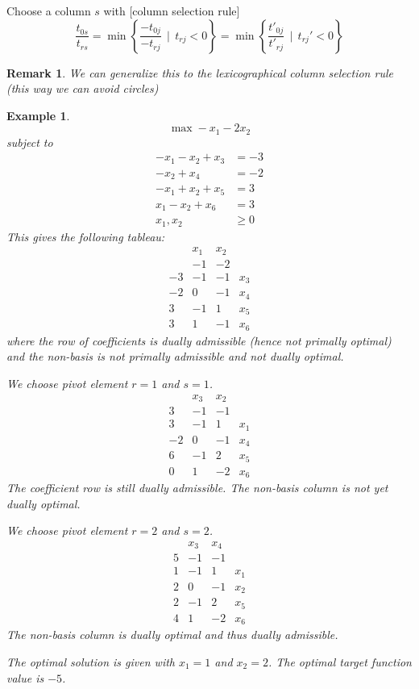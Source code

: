 \documentclass[a4paper]{article}
\numberwithin{lecref}{section}
\newcounter{exercises}
\newtheorem{example}[exercises]{Example}
\newtheorem*{Remark}{Remark}
\newcommand{\SetDef}[2]{\left\{#1\,\mid\,#2\right\}}
\begin{document}
Choose a column $s$ with [column selection rule]
\[ \frac{t_{0s}}{t_{rs}} = \min\SetDef{\frac{-t_{0j}}{-t_{rj}}}{t_{rj} < 0} = \min\SetDef{\frac{t'_{0j}}{t'_{rj}}}{t_{rj}' < 0} \]

\begin{Remark}
	We can generalize this to the lexicographical column selection rule (this way we can avoid circles)
\end{Remark}

\begin{example}
	\[ \max -x_1 - 2x_2 \]
	subject to
	\begin{align*}
		-x_1 - x_2 + x_3 &= -3 \\
		-x_2 + x_4 &= -2 \\
		-x_1 + x_2 + x_5 &= 3 \\
		x_1 - x_2 + x_6 &= 3 \\
		x_1, x_2 &\geq 0
	\end{align*}
	This gives the following tableau:
	\[\begin{array}{c|ccc}
		   & x_1 & x_2 & \\
		   & -1 & -2 & \\
		\hline
		-3 & -1 & -1 & x_3 \\
		-2 & 0 & -1 & x_4 \\
		3  & -1 & 1 & x_5 \\
		3  & 1 & -1 & x_6
	\end{array}\]
	where the row of coefficients is dually admissible (hence not primally optimal) and the non-basis is not primally admissible and not dually optimal.

	We choose pivot element $r = 1$ and $s = 1$.
	\[\begin{array}{c|ccc}
		   & x_3 & x_2 & \\
		3  & -1 & -1 & \\
		\hline
		3 & -1 & 1 & x_1 \\
		-2 & 0 & -1 & x_4 \\
		6  & -1 & 2 & x_5 \\
		0  & 1 & -2 & x_6
	\end{array}\]
	The coefficient row is still dually admissible. The non-basis column is not yet dually optimal.

	We choose pivot element $r = 2$ and $s = 2$.
	\[\begin{array}{c|ccc}
		   & x_3 & x_4 & \\
		5  & -1 & -1 & \\
		\hline
		1 & -1 & 1 & x_1 \\
		2 & 0 & -1 & x_2 \\
		2 & -1 & 2 & x_5 \\
		4 & 1 & -2 & x_6
	\end{array}\]
	The non-basis column is dually optimal and thus dually admissible.

	The optimal solution is given with $x_1 = 1$ and $x_2 = 2$. The optimal target function value is $-5$.
\end{example}
\end{document}
